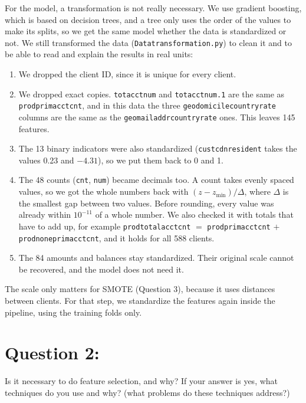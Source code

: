 \documentclass[12pt]{article}
\renewcommand{\_}{\textunderscore\allowbreak}
\begin{document}
For the model, a transformation is not really necessary. We use gradient boosting, which is based on decision trees, and a tree only uses the order of the values to make its splits, so we get the same model whether the data is standardized or not. We still transformed the data (\texttt{Data\_transformation.py}) to clean it and to be able to read and explain the results in real units:
\begin{enumerate}[nosep]
    \item We dropped the client ID, since it is unique for every client.
    \item We dropped exact copies. \texttt{tot\_acct\_num} and \texttt{tot\_acct\_num.1} are the same as \texttt{prod\_prim\_acct\_cnt}, and in this data the three \texttt{geo\_domicile\_country\_rate\_*} columns are the same as the \texttt{geo\_mail\_addr\_country\_rate\_*} ones. This leaves 145 features.
    \item The 13 binary indicators were also standardized (\texttt{cust\_cdn\_resident} takes the values 0.23 and $-4.31$), so we put them back to 0 and 1.
    \item The 48 counts (\texttt{\_cnt}, \texttt{\_num}) became decimals too. A count takes evenly spaced values, so we got the whole numbers back with $(z - z_{\min})/\Delta$, where $\Delta$ is the smallest gap between two values. Before rounding, every value was already within $10^{-11}$ of a whole number. We also checked it with totals that have to add up, for example \texttt{prod\_total\_acct\_cnt} $=$ \texttt{prod\_prim\_acct\_cnt} $+$ \texttt{prod\_none\_prim\_acct\_cnt}, and it holds for all 588 clients.
    \item The 84 amounts and balances stay standardized. Their original scale cannot be recovered, and the model does not need it.
\end{enumerate}

The scale only matters for SMOTE (Question 3), because it uses distances between clients. For that step, we standardize the features again inside the pipeline, using the training folds only.

\clearpage
\section*{Question 2:}

\begin{question}
Is it necessary to do feature selection, and why? If your answer is yes, what techniques do you use and why? (what problems do these techniques address?)
\end{question}
\end{document}
